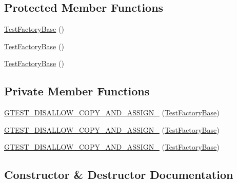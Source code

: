 \subsection*{Protected Member Functions}
\begin{DoxyCompactItemize}
\item 
\mbox{\hyperlink{classtesting_1_1internal_1_1_test_factory_base_afedbf147b2a213517b315880d8c81427}{Test\+Factory\+Base}} ()
\item 
\mbox{\hyperlink{classtesting_1_1internal_1_1_test_factory_base_afedbf147b2a213517b315880d8c81427}{Test\+Factory\+Base}} ()
\item 
\mbox{\hyperlink{classtesting_1_1internal_1_1_test_factory_base_afedbf147b2a213517b315880d8c81427}{Test\+Factory\+Base}} ()
\end{DoxyCompactItemize}
\subsection*{Private Member Functions}
\begin{DoxyCompactItemize}
\item 
\mbox{\hyperlink{classtesting_1_1internal_1_1_test_factory_base_a85d7cb90e00f165e61a008be77293fb4}{G\+T\+E\+S\+T\+\_\+\+D\+I\+S\+A\+L\+L\+O\+W\+\_\+\+C\+O\+P\+Y\+\_\+\+A\+N\+D\+\_\+\+A\+S\+S\+I\+G\+N\+\_\+}} (\mbox{\hyperlink{classtesting_1_1internal_1_1_test_factory_base}{Test\+Factory\+Base}})
\item 
\mbox{\hyperlink{classtesting_1_1internal_1_1_test_factory_base_a85d7cb90e00f165e61a008be77293fb4}{G\+T\+E\+S\+T\+\_\+\+D\+I\+S\+A\+L\+L\+O\+W\+\_\+\+C\+O\+P\+Y\+\_\+\+A\+N\+D\+\_\+\+A\+S\+S\+I\+G\+N\+\_\+}} (\mbox{\hyperlink{classtesting_1_1internal_1_1_test_factory_base}{Test\+Factory\+Base}})
\item 
\mbox{\hyperlink{classtesting_1_1internal_1_1_test_factory_base_a85d7cb90e00f165e61a008be77293fb4}{G\+T\+E\+S\+T\+\_\+\+D\+I\+S\+A\+L\+L\+O\+W\+\_\+\+C\+O\+P\+Y\+\_\+\+A\+N\+D\+\_\+\+A\+S\+S\+I\+G\+N\+\_\+}} (\mbox{\hyperlink{classtesting_1_1internal_1_1_test_factory_base}{Test\+Factory\+Base}})
\end{DoxyCompactItemize}


\subsection{Constructor \& Destructor Documentation}
\mbox{\label{classtesting_1_1internal_1_1_test_factory_base_a18f22a7594336a36642289c1decddc9e}} 
